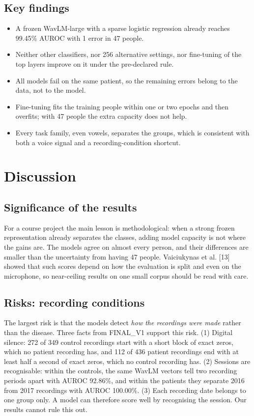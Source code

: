 \documentclass[11pt,a4paper]{article}
\begin{document}
\subsection{Key findings}\label{sec:findings}
\begin{itemize}\item A frozen WavLM-large with a sparse logistic regression already reaches 99.45\% AUROC with 1 error in 47 people.
\item Neither other classifiers, nor 256 alternative settings, nor fine-tuning of the top layers improve on it under the pre-declared rule.
\item All models fail on the same patient, so the remaining errors belong to the data, not to the model.
\item Fine-tuning fits the training people within one or two epochs and then overfits; with 47 people the extra capacity does not help.
\item Every task family, even vowels, separates the groups, which is consistent with both a voice signal and a recording-condition shortcut.
\end{itemize}
\section{Discussion}\label{sec:discussion}
\subsection{Significance of the results}\label{sec:significance}
For a course project the main lesson is methodological: when a strong frozen representation already separates the classes, adding model capacity is not where the gains are. The models agree on almost every person, and their differences are smaller than the uncertainty from having 47 people. Vaiciukynas et al. [13] showed that such scores depend on how the evaluation is split and even on the microphone, so near-ceiling results on one small corpus should be read with care.

\subsection{Risks: recording conditions}\label{sec:risks}
The largest risk is that the models detect \emph{how the recordings were made} rather than the disease. Three facts from FINAL\_V1 support this risk. (1) Digital silence: 272 of 349 control recordings start with a short block of exact zeros, which no patient recording has, and 112 of 436 patient recordings end with at least half a second of exact zeros, which no control recording has. (2) Sessions are recognisable: within the controls, the same WavLM vectors tell two recording periods apart with AUROC 92.86\%, and within the patients they separate 2016 from 2017 recordings with AUROC 100.00\%. (3) Each recording date belongs to one group only. A model can therefore score well by recognising the session. Our results cannot rule this out.
\end{document}
